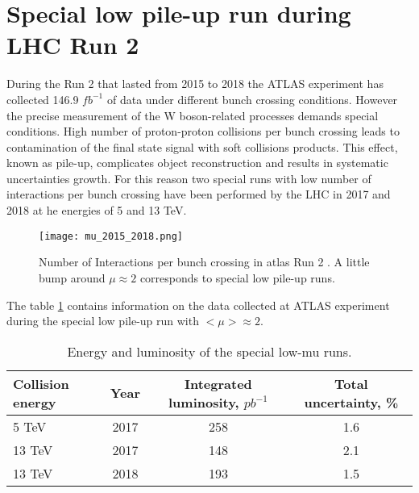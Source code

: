         \section{Special low pile-up run during LHC Run 2}
        During the Run 2 that lasted from 2015 to 2018 the ATLAS experiment has collected 146.9 $fb^{-1}$ of data under different bunch crossing conditions. However the precise measurement of the W boson-related processes demands special conditions. High number of proton-proton collisions per bunch crossing leads to contamination of the final state signal with soft collisions products. This effect, known as pile-up, complicates object reconstruction and results in systematic uncertainties growth. For this reason two special runs with low number of interactions per bunch crossing have been performed by the LHC in 2017 and 2018 at he energies of 5 and 13 TeV. \\
		 \begin{figure}[htpb]
			\texttt{[image: mu\_2015\_2018.png]}
			\caption{ Number of Interactions per bunch crossing in \gls{atlas} Run 2 \cite{run2lumi}. A little bump around $\mu \approx 2$ corresponds to special low pile-up runs.}
			\label{fig::run2lumi}
			\end{figure}
			The table \ref{tab::lowmu} contains information on the data collected at ATLAS experiment during the special low pile-up run with $<\mu> \approx 2$.\\
			\begin{table}
			\centering			
			\begin{tabular}{|l|c|c|c|}
			\hline
			\label{tab::lowmu}
			\textbf{Collision energy} & \textbf{Year}& \textbf{Integrated luminosity, $pb^{-1}$ }&  Total uncertainty, \%\\
			\hline
			5 TeV  & 2017 & 258& 1.6\\
			13 TeV  & 2017 & 148& 2.1 \\
			13 TeV  & 2018 & 193& 1.5\\
			\hline
			\end{tabular}
			\caption{Energy and luminosity of the special low-mu runs.}
			\end{table}